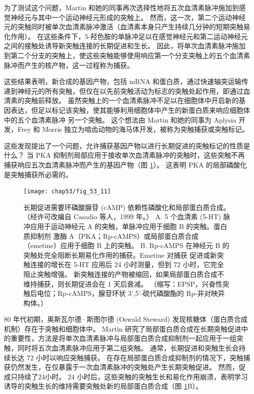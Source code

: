 为了测试这个问题，Martin 和她的同事再次选择性地将五次血清素脉冲施加到感觉神经元与其中一个运动神经元形成的突触上。
然而，这一次，第二个运动神经元的突触同时被单次血清素脉冲激活（血清素本身只产生持续几分钟的短期突触易化作用）。
在这些条件下，5-羟色胺的单脉冲足以在感觉神经元和第二运动神经元之间的接触处诱导新突触连接的长期促进和生长。
因此，将单次血清素脉冲施加到第二个分支的突触上，使这些突触能够使用响应第一个分支突触上的五个血清素脉冲而产生的核产物，这一过程称为捕获。


这些结果表明，新合成的基因产物，包括 mRNA 和蛋白质，通过快速轴突运输传递到神经元的所有突触，但仅在以先前突触活动为标志的突触处起作用，即通过血清素的突触前释放。
虽然突触上的一个血清素脉冲不足以在细胞体中开启新的基因表达，但足以标记该突触，使其能够利用细胞体中产生的新蛋白质来响应细胞体中的五个血清素脉冲 另一个突触。
这个想法由 Martin 和她的同事为 Aplysia 开发，Frey 和 Morris 独立为啮齿动物的海马体开发，被称为突触捕获或突触标记。


这些发现提出了一个问题，允许捕获基因产物以进行长期促进的突触标记的性质是什么？
当 PKA 抑制剂局部应用于接收单次血清素脉冲的突触时，这些突触不再捕获响应五次血清素脉冲而产生的基因产物（图 \ref{fig:53_11}）。
这表明 PKA 的局部磷酸化是突触捕获所必需的。


\begin{figure}[htbp]
	\centering
	\texttt{[image: chap53/fig\_53\_11]}
	\caption{长期促进需要环磷酸腺苷 (cAMP) 依赖性磷酸化和局部蛋白质合成。 （经许可改编自 Casadio 等人，1999 年。） A. 5 个血清素 (5-HT) 脉冲应用于运动神经元 A 的突触，单脉冲应用于细胞 B 的突触。蛋白质抑制剂 激酶 A（PKA；Rp-cAMPS）或局部蛋白质合成（emetine）应用于细胞 B 上的突触。 B. Rp-cAMPS 在神经元 B 的突触处完全阻断长期易化作用的捕获。Emetine 对捕获 促进或新突触连接的增长在 5-HT 应用后 24 小时测量，但到 72 小时，它完全阻止突触增强。 新突触连接的产物被缩回，如果局部蛋白质合成不维持捕获，则长期促进会在 1 天后衰减。 （缩写：EPSP，兴奋性突触后电位；Rp-cAMPS，腺苷环状 3',5'-硫代磷酸酯的 Rp-非对映异构体。）}
	\label{fig:53_11}
\end{figure}


80 年代初期，奥斯瓦尔德·斯图尔德 (Oswald Steward) 发现核糖体（蛋白质合成机制）存在于突触和细胞体中。
Martin 研究了局部蛋白质合成在长期突触促进中的重要性，方法是将单次血清素脉冲与局部蛋白质合成抑制剂一起应用于一组突触，同时将五次血清素脉冲应用于第二组突触。
通常，长期促进和突触生长会持续长达 72 小时以响应突触捕获。
在存在局部蛋白质合成抑制剂的情况下，突触捕获仍然发生，在仅暴露于一次血清素脉冲的突触处产生长期突触促进。
然而，促成只持续了24小时。
24 小时后，这些突触的突触生长和易化作用崩溃，表明学习诱导的突触生长的维持需要突触处新的局部蛋白质合成（图 \ref{fig:53_11}B）。



